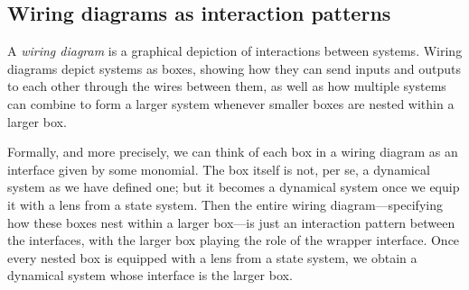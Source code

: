 \documentclass[Book-Poly]{subfiles}
\begin{document}

\subsection{Wiring diagrams as interaction patterns}


A \emph{wiring diagram} is a graphical depiction of interactions between systems.
Wiring diagrams depict systems as boxes, showing how they can send inputs and outputs to each other through the wires between them, as well as how multiple systems can combine to form a larger system whenever smaller boxes are nested within a larger box.


Formally, and more precisely, we can think of each box in a wiring diagram as an interface given by some monomial.
The box itself is not, per se, a dynamical system as we have defined one; but it becomes a dynamical system once we equip it with a lens from a state system.
Then the entire wiring diagram---specifying how these boxes nest within a larger box---is just an interaction pattern between the interfaces, with the larger box playing the role of the wrapper interface.
Once every nested box is equipped with a lens from a state system, we obtain a dynamical system whose interface is the larger box.
\end{document}
